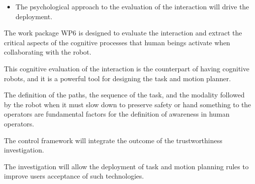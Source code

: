 \begin{itemize}
\item
  The psychological approach to the evaluation of the interaction will
  drive the deployment.
\end{itemize}

The work package WP6 is designed to evaluate the interaction and extract
the critical aspects of the cognitive processes that human beings
activate when collaborating with the robot.

This cognitive evaluation of the interaction is the counterpart of
having cognitive robots, and it is a powerful tool for designing the
task and motion planner.

The definition of the paths, the sequence of the task, and the modality
followed by the robot when it must slow down to preserve safety or hand
something to the operators are fundamental factors for the definition of
awareness in human operators.

The control framework will integrate the outcome of the trustworthiness
investigation.

The investigation will allow the deployment of task and motion planning
rules to improve users\textquotesingle{} acceptance of such
technologies.